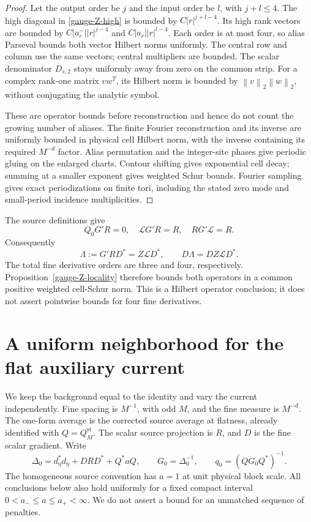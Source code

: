 \documentclass[11pt]{article}
\theoremstyle{remark}
\newcommand{\norm}[1]{\left\|#1\right\|}
\begin{document}
\begin{proof}
Let the output order be $j$ and the input order be $l$, with
$j+l\le4$. The high diagonal in \eqref{gauge-Z-high} is bounded
by $C|r|^{j+l-4}$. Its high rank vectors are bounded by
$C|a_r^-||r|^{j-4}$ and $C|a_r||r|^{l-4}$.
Each order is at most four, so alias Parseval bounds both vector
Hilbert norms uniformly. The central row and column use the same
vectors; central multipliers are bounded. The scalar denominator
$D_{s,2}$ stays uniformly away from zero on the common strip.
For a complex rank-one matrix $vw^T$, its Hilbert norm is bounded
by $\norm v_2\norm w_2$, without conjugating the analytic symbol.

These are operator bounds before reconstruction and hence do not
count the growing number of aliases. The finite Fourier reconstruction
and its inverse are uniformly bounded in physical cell Hilbert
norm, with the inverse containing its required $M^{-d}$ factor.
Alias permutation and the integer-site phases give periodic gluing
on the enlarged charts. Contour shifting gives exponential cell
decay; summing at a smaller exponent gives weighted Schur bounds.
Fourier sampling gives exact periodizations on finite tori, including
the stated zero mode and small-period incidence multiplicities.
\end{proof}

The source definitions give
\[
 Q_0G'R=0,\quad \mathcal L G'R=R,\quad
 RG'\mathcal L=R.
\]
Consequently
\[
 \Lambda:=G'RD^*=Z\mathcal L D^*,\qquad
 D\Lambda=DZ\mathcal L D^*.
\]
The total fine derivative orders are three and four, respectively.
Proposition~\ref{gauge-Z-locality} therefore bounds both operators
in a common positive weighted cell-Schur norm. This is a Hilbert
operator conclusion; it does not assert pointwise bounds for four
fine derivatives.


\section{A uniform neighborhood for the flat auxiliary current}
\label{current-section}

We keep the background equal to the identity and vary the current
independently. Fine spacing is $M^{-1}$, with odd $M$, and the fine
measure is $M^{-d}$. The one-form average is the corrected source
average at flatness, already identified with $Q=Q_M^{\mathrm{st}}$.
The scalar source projection is $R$, and $D$ is the fine scalar
gradient. Write
\[
 \Delta_0=d_\eta^*d_\eta+DRD^*+Q^*aQ,
 \qquad G_0=\Delta_0^{-1},
 \qquad q_0=(QG_0Q^*)^{-1}.
\]
The homogeneous source convention has $a=1$ at unit physical block
scale. All conclusions below also hold uniformly for a fixed compact
interval $0<a_-\le a\le a_+<\infty$. We do not assert a bound for an
unmatched sequence of penalties.
\end{document}
